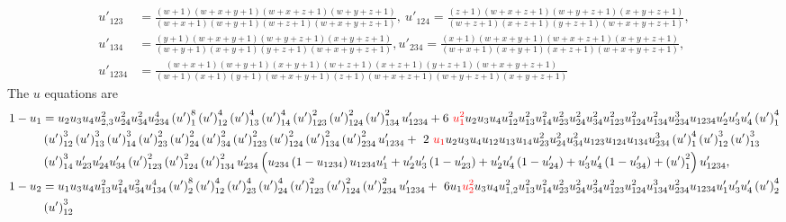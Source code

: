 \documentclass[hidelinks,12pt]{article}
\begin{document}
\begin{enumerate}
{\begin{align*}
u'_{123} &=  \frac{(w+1) (w+x+y+1) (w+x+z+1) (w+y+z+1)}{(w+x+1) (w+y+1) (w+z+1) (w+x+y+z+1)},~u'_{124}= \frac{(z+1) (w+x+z+1) (w+y+z+1) (x+y+z+1)}{(w+z+1) (x+z+1) (y+z+1) (w+x+y+z+1)},\nonumber \\  u'_{134}&= \frac{(y+1) (w+x+y+1) (w+y+z+1) (x+y+z+1)}{(w+y+1)(x+y+1) (y+z+1) (w+x+y+z+1)},u'_{234} = \frac{(x+1) (w+x+y+1) (w+x+z+1) (x+y+z+1)}{(w+x+1) (x+y+1) (x+z+1) (w+x+y+z+1)},\nonumber \\  u'_{1234} &= \frac{(w+x+1) (w+y+1)(x+y+1) (w+z+1) (x+z+1) (y+z+1) (w+x+y+z+1)}{(w+1) (x+1) (y+1) (w+x+y+1) (z+1) (w+x+z+1) (w+y+z+1) (x+y+z+1)} \nonumber
\end{align*}
}
\newpage
\vspace*{-25pt}
The $u$ equations are 
{\tiny
{\begin{align*}
1-u_1&=u_2 u_3 u_4 u_{2,3}^2 u_{24}^2 u_{34}^2 u_{234}^4
   \left(u'\right)_1^8 \left(u'\right)_{12}^4 \left(u'\right)_{13}^4
   \left(u'\right)_{14}^4 \left(u'\right)_{123}^2
   \left(u'\right)_{124}^2 \left(u'\right)_{134}^2 u'_{1234}+ 6~
 \textcolor{red}{  u_1^2} u_2 u_3 u_4 u_{12}^2 u_{13}^2 u_{14}^2 u_{23}^2 u_{24}^2
   u_{34}^2 u_{123}^2 u_{124}^2 u_{134}^2 u_{234}^3 u_{1234}
   u'_2 u'_3 u'_4 \left(u'\right)_1^4  \nonumber \\ &\left(u'\right)_{12}^3
   \left(u'\right)_{13}^3 \left(u'\right)_{14}^3
   \left(u'\right)_{23}^2 \left(u'\right)_{24}^2
   \left(u'\right)_{34}^2 \left(u'\right)_{123}^2
   \left(u'\right)_{124}^2 \left(u'\right)_{134}^2
   \left(u'\right)_{234}^2 u'_{1234}+~2 ~\textcolor{red}{u_1} u_2 u_3 u_4 u_{12}
   u_{13} u_{14} u_{23}^2 u_{24}^2 u_{34}^2 u_{123} u_{124}
   u_{134} u_{234}^3 \left(u'\right)_1^4 \left(u'\right)_{12}^3
   \left(u'\right)_{13}^3 \nonumber \\ & \left(u'\right)_{14}^3 u'_{23} u'_{24}
   u'_{34} \left(u'\right)_{123}^2 \left(u'\right)_{124}^2
   \left(u'\right)_{134}^2 u'_{234} \left(u_{234}
   \left(1-u_{1234}\right) u_{1234} u'_1+u'_2 u'_3
   \left(1-u'_{23}\right)+u'_2 u'_4 \left(1-u'_{24}\right)+u'_3 u'_4
   \left(1-u'_{34}\right)+\left(u'\right)_1^2\right) u'_{1234} ,\nonumber \\
   1-u_2&=u_1 u_3 u_4 u_{13}^2 u_{14}^2 u_{34}^2 u_{134}^4
   \left(u'\right)_2^8 \left(u'\right)_{12}^4 \left(u'\right)_{23}^4
   \left(u'\right)_{24}^4 \left(u'\right)_{123}^2
   \left(u'\right)_{124}^2 \left(u'\right)_{234}^2 u'_{1234}+~6
   u_1 \textcolor{red}{u_2^2} u_3 u_4 u_{1,2}^2 u_{13}^2 u_{14}^2 u_{23}^2 u_{24}^2
   u_{34}^2 u_{123}^2 u_{124}^2 u_{134}^3 u_{234}^2 u_{1234}
   u'_1 u'_3 u'_4 \left(u'\right)_2^4 \nonumber \\ &\left(u'\right)_{12}^3

\end{align*}}}
\end{enumerate}
\end{document}
